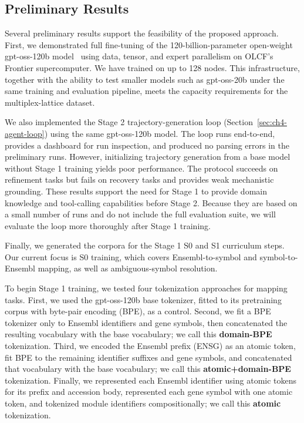 \documentclass[thesis,letterpaper,12pt]{utthesis}
\begin{document}
\subsection{Preliminary Results}\label{sec:ch4-prelim}
Several preliminary results support the feasibility of the proposed approach. First, we demonstrated full fine-tuning of the 120-billion-parameter open-weight gpt-oss-120b model~\cite{gpt-oss} using data, tensor, and expert parallelism on OLCF's Frontier supercomputer. We have trained on up to 128 nodes. This infrastructure, together with the ability to test smaller models such as gpt-oss-20b under the same training and evaluation pipeline, meets the capacity requirements for the multiplex-lattice dataset.

We also implemented the Stage 2 trajectory-generation loop (Section~\ref{sec:ch4-agent-loop}) using the same gpt-oss-120b model. The loop runs end-to-end, provides a dashboard for run inspection, and produced no parsing errors in the preliminary runs. However, initializing trajectory generation from a base model without Stage 1 training yields poor performance. The protocol succeeds on refinement tasks but fails on recovery tasks and provides weak mechanistic grounding. These results support the need for Stage 1 to provide domain knowledge and tool-calling capabilities before Stage 2. Because they are based on a small number of runs and do not include the full evaluation suite, we will evaluate the loop more thoroughly after Stage 1 training.

Finally, we generated the corpora for the Stage 1 S0 and S1 curriculum steps. Our current focus is S0 training, which covers Ensembl-to-symbol and symbol-to-Ensembl mapping, as well as ambiguous-symbol resolution.

To begin Stage 1 training, we tested four tokenization approaches for mapping tasks. First, we used the gpt-oss-120b base tokenizer, fitted to its pretraining corpus with byte-pair encoding (BPE), as a control. Second, we fit a BPE tokenizer only to Ensembl identifiers and gene symbols, then concatenated the resulting vocabulary with the base vocabulary; we call this \textbf{domain-BPE} tokenization. Third, we encoded the Ensembl prefix (ENSG) as an atomic token, fit BPE to the remaining identifier suffixes and gene symbols, and concatenated that vocabulary with the base vocabulary; we call this \textbf{atomic+domain-BPE} tokenization. Finally, we represented each Ensembl identifier using atomic tokens for its prefix and accession body, represented each gene symbol with one atomic token, and tokenized module identifiers compositionally; we call this \textbf{atomic} tokenization.
\end{document}
